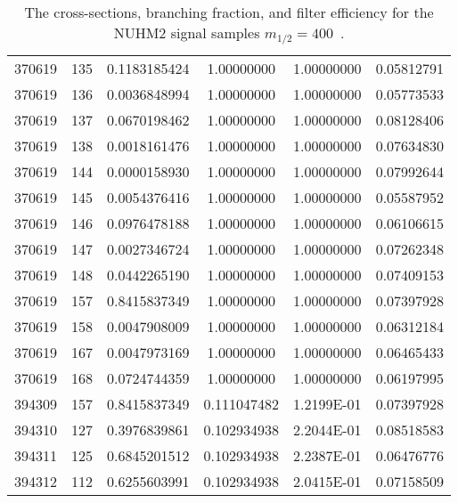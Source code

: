 \begin{table}[htp]
{{\begin{tabular}{cccccc}
370619 & 135         & 0.1183185424         & 1.00000000  & 1.00000000        & 0.05812791\\
370619 & 136         & 0.0036848994         & 1.00000000  & 1.00000000        & 0.05773533\\
370619 & 137         & 0.0670198462         & 1.00000000  & 1.00000000        & 0.08128406\\
370619 & 138         & 0.0018161476         & 1.00000000  & 1.00000000        & 0.07634830\\
370619 & 144         & 0.0000158930         & 1.00000000  & 1.00000000        & 0.07992644\\
370619 & 145         & 0.0054376416         & 1.00000000  & 1.00000000        & 0.05587952\\
370619 & 146         & 0.0976478188         & 1.00000000  & 1.00000000        & 0.06106615\\
370619 & 147         & 0.0027346724         & 1.00000000  & 1.00000000        & 0.07262348\\
370619 & 148         & 0.0442265190         & 1.00000000  & 1.00000000        & 0.07409153\\
370619 & 157         & 0.8415837349         & 1.00000000  & 1.00000000        & 0.07397928\\
370619 & 158         & 0.0047908009         & 1.00000000  & 1.00000000        & 0.06312184\\
370619 & 167         & 0.0047973169         & 1.00000000  & 1.00000000        & 0.06465433\\
370619 & 168         & 0.0724744359         & 1.00000000  & 1.00000000        & 0.06197995\\ 
394309 & 157         & 0.8415837349         & 0.111047482 & 1.2199E-01        & 0.07397928\\
394310 & 127         & 0.3976839861         & 0.102934938 & 2.2044E-01        & 0.08518583\\
394311 & 125         & 0.6845201512         & 0.102934938 & 2.2387E-01        & 0.06476776\\
394312 & 112         & 0.6255603991         & 0.102934938 & 2.0415E-01        & 0.07158509\\
\hline
\hline
\end{tabular}
}
}
\caption{The cross-sections, branching fraction, and filter efficiency for the NUHM2 signal samples $m_{1/2} = 400$~{\GeV}.}
\label{tab:app_xsec_m12_400}
\end{table}%

